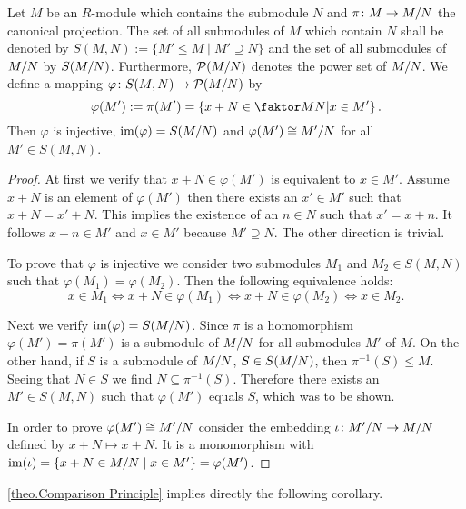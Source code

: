 \begin{thm} \label{theo.Comparison Principle}
Let $M$ be an $R$-module which contains the submodule $N$ and $\pi\colon M\to\MtN$ the canonical projection. The set of all submodules of $M$ which contain $N$ shall be denoted by $S(M,N):=\lbrace M'\leq M \mid M'\supseteq N\rbrace$ and the set of all submodules of $\MtN$ by $S(\MtN)$. Furthermore, $\mathcal{P}(\MtN)$ denotes the power set of $\MtN$. We define a mapping $\varphi\colon S(M,N)\to \mathcal{P}(\MtN)$ by
\begin{equation*}
\varphi(M'):=\pi(M')=\left\lbrace x+N\in \MTN \middle\arrowvert x\in M'\right\rbrace.
\end{equation*}
Then $\varphi$ is injective, $\im(\varphi)=S(\MtN)$ and $\varphi(M')\cong\nicefrac{M'}{N}$ for all $M'\in S(M,N)$.
\end{thm}
\begin{proof}
At first we verify that $x+N\in \varphi(M')$ is equivalent to $x\in M'$. Assume $x+N$ is an element of $\varphi(M')$ then there exists an $x'\in M'$ such that $x+N=x'+N$. This implies the existence of an $n\in N$ such that $x'=x+n$. It follows $x+n\in M'$ and $x\in M'$ because $M'\supseteq N$. The other direction is trivial.

To prove that $\varphi$ is injective we consider two submodules $M_1$ and $M_2\in S(M,N)$ such that $\varphi(M_1)=\varphi(M_2)$. Then the following equivalence holds:
\begin{equation*}
x\in M_1\Leftrightarrow x+N\in \varphi(M_1)\Leftrightarrow x+N\in\varphi(M_2)\Leftrightarrow x\in M_2.
\end{equation*}

Next we verify $\im(\varphi)=S(\MtN)$. Since $\pi$ is a homomorphism $\varphi(M')=\pi(M')$ is a submodule of $\MtN$ for all submodules $M'$ of $M$. On the other hand, if $S$ is a submodule of $\MtN$, \ie $S\in S(\MtN)$, then $\pi^{-1}(S)\leq M$. Seeing that $N\in S$ we find $N\subseteq\pi^{-1}(S)$. Therefore there exists an $M'\in S(M,N)$ such that $\varphi(M')$ equals $S$, which was to be shown.

In order to prove $\varphi(M')\cong\nicefrac{M'}{N}$ consider the embedding $\iota\colon \nicefrac{M'}{N}\to\MtN$ defined by $x+N\mapsto x+N$. It is a monomorphism with $\im(\iota)=\lbrace x+N\in\MtN \mid x\in M'\rbrace=\varphi(M')$.
\end{proof}

\cref{theo.Comparison Principle} implies directly the following corollary.

